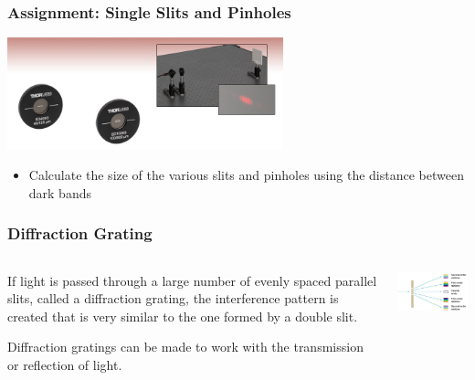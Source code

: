 \documentclass{beamer}
\begin{document}
\begin{frame}\frametitle{Assignment: Single Slits and Pinholes}

\begin{center}
\includegraphics[width=8cm]{fig/thorDouble.jpg}
\end{center}

\vspace{1cm}

\begin{itemize}
\item Calculate the size of the various slits and pinholes using the distance between dark bands 
\end{itemize}

\end{frame}

\begin{frame}\frametitle{Diffraction Grating}
\begin{columns}
\begin{column}{5cm}
If light is passed through a large number of evenly spaced parallel slits, called a diffraction grating, the interference pattern is created that is very similar to the one formed by a double slit. \newline

Diffraction gratings can be made to work with the transmission or reflection of light. 
\end{column}
\begin{column}{6cm}
\begin{center}
\includegraphics[width=5.8cm]{fig/dg1.jpg}
\end{center}
\end{column}
\end{columns}
\end{frame}
\end{document}
